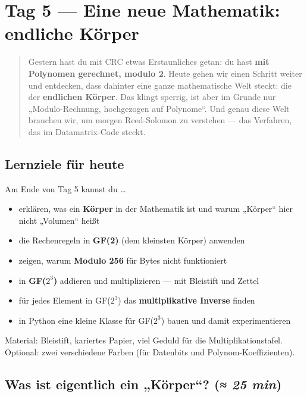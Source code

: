 \chapter{Tag 5 — Eine neue Mathematik: endliche Körper}

\begin{quote}
Gestern hast du mit CRC etwas Erstaunliches getan: du hast \textbf{mit
Polynomen gerechnet, modulo 2}. Heute gehen wir einen Schritt weiter
und entdecken, dass dahinter eine ganze mathematische Welt steckt:
die der \textbf{endlichen Körper}. Das klingt sperrig, ist aber im
Grunde nur „Modulo-Rechnung, hochgezogen auf Polynome“. Und genau
diese Welt brauchen wir, um morgen Reed-Solomon zu verstehen — das
Verfahren, das im Datamatrix-Code steckt.
\end{quote}

\section*{Lernziele für heute}

Am Ende von Tag 5 kannst du \dots

\begin{itemize}
\item erklären, was ein \textbf{Körper} in der Mathematik ist und
  warum „Körper“ hier nicht „Volumen“ heißt
\item die Rechenregeln in \textbf{GF(2)} (dem kleinsten Körper)
  anwenden
\item zeigen, warum \textbf{Modulo 256} für Bytes nicht funktioniert
\item in \textbf{GF($2^3$)} addieren und multiplizieren — mit
  Bleistift und Zettel
\item für jedes Element in GF($2^3$) das \textbf{multiplikative
  Inverse} finden
\item in Python eine kleine Klasse für GF($2^3$) bauen und damit
  experimentieren
\end{itemize}

Material: Bleistift, kariertes Papier, viel Geduld für die
Multiplikationstafel. Optional: zwei verschiedene Farben (für
Datenbits und Polynom-Koeffizienten).

\section{Was ist eigentlich ein „Körper“? \normalfont(\textit{≈ 25 min})}

